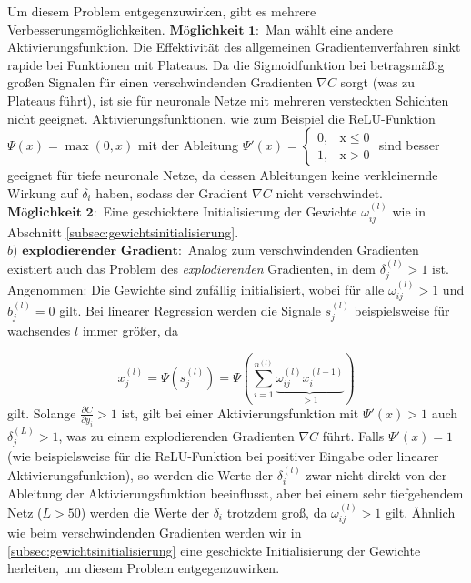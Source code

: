 Um diesem Problem entgegenzuwirken, gibt es mehrere Verbesserungsmöglichkeiten.\linebreak
$\textbf{Möglichkeit 1}:$ Man wählt eine andere Aktivierungsfunktion. Die Effektivität des allgemeinen
Gradientenverfahren sinkt rapide bei Funktionen mit Plateaus. Da die Sigmoidfunktion bei betragsmäßig großen Signalen
für einen verschwindenden Gradienten $\nabla C$ sorgt (was zu Plateaus führt), ist sie für neuronale Netze mit mehreren
versteckten Schichten nicht geeignet. Aktivierungsfunktionen, wie zum Beispiel die ReLU-Funktion $\Psi(x)=\max(0,x)$ mit
der Ableitung $\Psi'(x)= \begin {cases} 0, &\text{x}\leq 0\\ 1, &\text{x}>0\end{cases}$ sind besser geeignet für tiefe
neuronale Netze, da dessen Ableitungen keine verkleinernde Wirkung auf $\delta_i$ haben, sodass der Gradient $\nabla C$ nicht
verschwindet.\\
$\textbf{Möglichkeit 2}:$ Eine geschicktere Initialisierung der Gewichte $\omega_{ij}^{(l)}$ wie in Abschnitt
\ref{subsec:gewichtsinitialisierung}.\\
$b)$ $\textbf{explodierender Gradient}:$
Analog zum verschwindenden Gradienten existiert auch das Problem des \textit{explodierenden} Gradienten, in dem
$\delta_j^{(l)}>1$ ist.\\
Angenommen: Die Gewichte sind zufällig initialisiert, wobei für alle $\omega_{ij}^{(l)}>1$ und $b_j^{(l)}=0$
gilt. Bei linearer Regression werden die Signale $s_j^{(l)}$  beispielsweise für wachsendes $l$ immer größer, da

\[
    x_j^{(l)}=\Psi(s_j^{(l)})=\Psi\left( \sum\limits_{i=1}^{n^{(l)}} \underbrace{\omega_{ij}^{(l)}x_{i}^{(l-1)}}_{>1} \right)
\]
gilt. Solange $\frac{\partial C}{\partial y_i} > 1$ ist, gilt bei einer Aktivierungsfunktion mit $\Psi'(x)>1$ auch $\delta_j^{(L)}>1$,
was zu einem explodierenden Gradienten $\nabla C$ führt. Falls $\Psi'(x)=1$ (wie beispielsweise für die ReLU-Funktion bei
positiver Eingabe oder linearer Aktivierungsfunktion), so werden die Werte der $\delta_i^{(l)}$ zwar nicht direkt von der Ableitung
der Aktivierungsfunktion beeinflusst, aber bei einem sehr tiefgehendem Netz ($L>50$) werden die Werte der $\delta_i$ trotzdem
groß, da $\omega_{ij}^{(l)}>1$ gilt. Ähnlich wie beim verschwindenden Gradienten werden wir in
\ref{subsec:gewichtsinitialisierung} eine geschickte Initialisierung der Gewichte herleiten, um diesem Problem
entgegenzuwirken.


